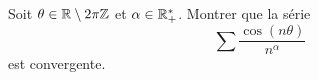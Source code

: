 \documentclass{magnolia}
\begin{document}
\begin{exoUnique}
\exo Soit $\theta\in\mathbb{R}\setminus 2\pi\mathbb{Z}$ et $\alpha\in\mathbb{R}_+^*$. Montrer que la série
  \[\sum \frac{\cos(n\theta)}{n^\alpha}\]
  est convergente.
\end{exoUnique}










\end{document}

